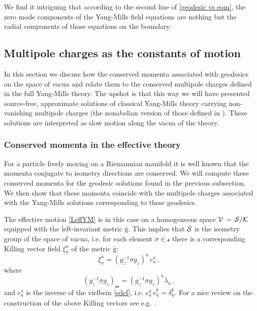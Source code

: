 \documentclass[11pt,a4paper]{article}
\def\calk{{\cal K}}
\def\calsm{{\boldsymbol{\mathscr m}}}
\def\cals{{\cal S}}
\def\calss{{\boldsymbol{\mathscr s}}}
\def\calv{{\cal V}}
\def\ua{{\underline{a}}}
\def\ub{{\underline{b}}}
\def\rg{{\mathrm{g}}}
\begin{document}
    We find it intriguing that according to the second line of \eqref{geodesic vs eom}, the zero mode components of the Yang-Mills field equations are nothing but the radial components of those equations on the boundary.
    
    \subsection{Multipole charges as the constants of motion}\label{charges-section}
    In this section we discuss how the conserved momenta associated with geodesics on the space of vacua and relate them to the conserved multipole charges defined in the full Yang-Mills theory. The upshot is that this way we will have presented source-free, approximate solutions of classical Yang-Mills theory carrying non-vanishing multipole charges (the nonabelian version of those defined in \cite{Seraj:2016jxi}). These solutions are interpreted as slow motion along the vacua of the theory. 
    
    
    
    \subsubsection{Conserved momenta in the effective theory}
    For a particle freely moving on a Riemannian manifold it is well known that the momenta conjugate to isometry directions are conserved. We will compute these conserved momenta for the geodesic solutions found in the previous subsection. We then show that these momenta coincide with the multipole charges associated with the Yang-Mills solutions corresponding to these geodesics.

    

    The effective motion \eqref{LeffYM} is in this case on a homogeneous space $\calv\!~=~\!\cals/\calk$ equipped with the left-invariant metric $\bar{\rg}$. This implies that $\cals$ is the isometry group of the space of vacua, i.e. for each element $\sigma\in\calss$ there is a corresponding Killing vector field $\xi^a_\sigma$ of the metric $\bar{\rg}$:
    \begin{equation}
   \xi^a_\sigma=(g_z^{-1}\sigma g_z)^\ua\,e_\ua^a\,, \label{Killingv}
    \end{equation}
    where
    \begin{equation}
    (g_z^{-1}\sigma g_z)_\calsm=(g_z^{-1}\sigma g_z)^\ua\lambda_\ua\,,%
    \end{equation}
    and $e_\ua^a$ is the inverse of the vielbein \eqref{edef}, i.e. $ e_{\ua}^a\,e_a^\ub=\delta_\ua^\ub$. For a nice review on the construction of the above Killing vectors see e.g. \cite{Castellani:1983tb}.
    
\end{document}
